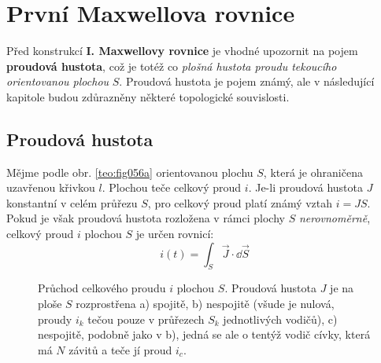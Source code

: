     \section{První Maxwellova rovnice}\label{ES:sec07}
      Před konstrukcí \textbf{I. Maxwellovy rovnice} je vhodné upozornit na pojem \textbf{proudová 
      hustota}, což je totéž co \emph{plošná hustota proudu tekoucího orientovanou plochou} \(S\). 
      Proudová hustota je pojem známý, ale v následující kapitole budou zdůrazněny některé 
      topologické souvislosti.
      
      \subsection{Proudová hustota}
        Mějme podle obr. \ref{teo:fig056a} orientovanou plochu \(S\), která je ohraničena uzavřenou
        křivkou \(l\). Plochou teče celkový proud \(i\). Je-li proudová hustota \(J\) konstantní v
        celém průřezu \(S\), pro celkový proud platí známý vztah \(i = JS\). Pokud je však proudová
        hustota rozložena v rámci plochy \(S\) \emph{nerovnoměrně}, celkový proud \(i\) plochou
        \(S\) je určen rovnicí:
        \begin{equation}\label{TEO:eq122}
          i(t) = \int_S\vec{J}\cdot \dd{\vec{S}}
        \end{equation}         
        \begin{figure}[ht!]
          \centering  
          \caption{Průchod celkového proudu \(i\) plochou \(S\). Proudová hustota \(J\) je na 
                   ploše \(S\) rozprostřena a) spojitě, b) nespojitě (všude je nulová, proudy 
                   \(i_k\) tečou pouze v průřezech \(S_k\) jednotlivých vodičů), c) nespojitě, 
                   podobně jako v b), jedná se ale o tentýž vodič cívky, která má \(N\) závitů a 
                   teče jí proud \(i_c\).} 
          \label{teo:fig056}
        \end{figure}
      
